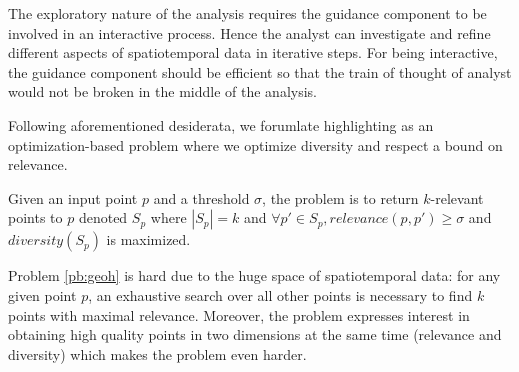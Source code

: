  The exploratory nature of the analysis requires the guidance component to be involved in an interactive process. Hence the analyst can investigate and refine different aspects of spatiotemporal data in iterative steps. For being interactive, the guidance component should be efficient so that the train of thought of analyst would not be broken in the middle of the analysis.

\vspace{5pt}
Following aforementioned desiderata, we forumlate highlighting as an optimization-based problem where we optimize diversity and respect a bound on relevance.

\begin{problem}[\pb]
\label{pb:geoh}
Given an input point $p$ and a threshold $\sigma$, the problem is to return $k$-relevant points to $p$ denoted $S_p$ where $|S_p| = k$ and $\forall p' \in S_p, \mathit{relevance}(p,p') \geq \sigma$ and $\mathit{diversity}(S_p)$ is maximized.
\end{problem}

Problem \ref{pb:geoh} is hard due to the huge space of spatiotemporal data: for any given point $p$, an exhaustive search over all other points is necessary to find $k$ points with maximal relevance. Moreover, the problem expresses interest in obtaining high quality points in two dimensions at the same time (relevance and diversity) which makes the problem even harder.

